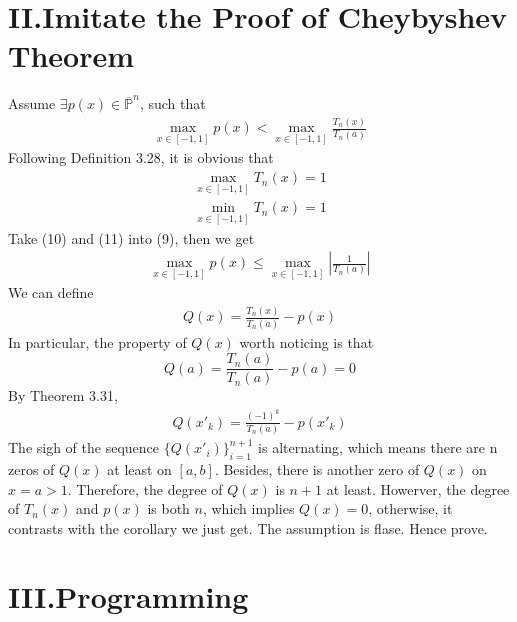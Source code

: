 \documentclass[twoside,a4paper,12pt]{article}
\begin{document}
\section*{II.Imitate the Proof of Cheybyshev Theorem}
Assume $\exists p(x) \in \overline{\mathbb{P}}^n$, such that 
\begin{gather}
\max_{x\in [-1,1]}p(x) < \max_{x\in[-1,1]}\frac{T_n(x)}{T_n(a)}
\end{gather}
Following Definition 3.28, it is obvious that
\begin{gather}
\max_{x\in[-1,1]}T_n(x)=1\\
\min_{x\in[-1,1]}T_n(x)=1
\end{gather}
Take (10) and (11) into (9), then we get
\begin{gather}
\max_{x\in [-1,1]}p(x) \leq \max_{x\in[-1,1]}|\frac{1}{T_n(a)}|
\end{gather}
We can define 
\begin{gather}
Q(x) = \frac{T_n(x)}{T_n(a)}-p(x)
\end{gather}
In particular, the property of $Q(x)$ worth noticing is that
\[
Q(a)=\frac{T_n(a)}{T_n(a)}-p(a)=0
\]
By Theorem 3.31,
\begin{gather}
Q(x'_k)=\frac{(-1)^k}{T_n(a)}-p(x'_k)
\end{gather}
The sigh of the sequence $\{Q(x'_i)\}_{i=1}^{n+1}$ is alternating, which means there are n zeros    of $Q(x)$ at least on $[a,b]$. Besides, there is another zero of $Q(x)$ on $x=a>1$. Therefore, the degree of $Q(x)$ is $n+1$ at least. Howerver, the degree of $T_n(x)$ and $p(x)$ is both $n$, which implies $Q(x)=0$, otherwise, it contrasts with the corollary we just get. The assumption is flase. Hence prove.
\section*{III.Programming}
\end{document}
